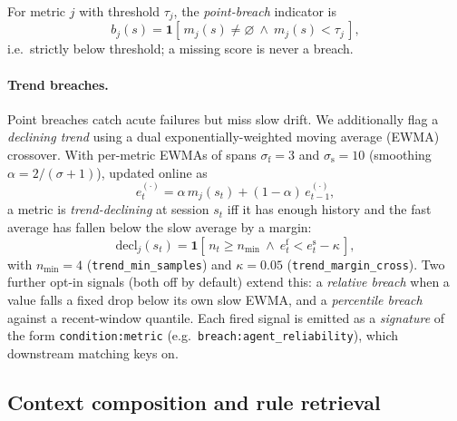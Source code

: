 \documentclass[letterpaper]{article} %
\newcommand{\ind}{\mathbf{1}}                     %
\begin{document}
For metric $j$ with threshold $\tau_j$, the \emph{point-breach}
indicator is
\begin{equation}
  b_j(s) = \ind\!\left[\,m_j(s) \ne \varnothing \ \wedge\ m_j(s) < \tau_j\,\right],
  \label{eq:breach}
\end{equation}
i.e.\ strictly below threshold; a missing score is never a breach.

\paragraph{Trend breaches.} Point breaches catch acute failures but miss slow drift. We
additionally flag a \emph{declining trend} using a dual exponentially-weighted moving average
(EWMA) crossover. With per-metric EWMAs of spans $\sigma_{\mathrm{f}}{=}3$ and
$\sigma_{\mathrm{s}}{=}10$ (smoothing $\alpha=2/(\sigma+1)$), updated online as
\begin{equation}
  e^{(\cdot)}_t = \alpha\,m_j(s_t) + (1-\alpha)\,e^{(\cdot)}_{t-1},
  \label{eq:ewma}
\end{equation}
a metric is \emph{trend-declining} at session $s_t$ iff it has enough history and the fast
average has fallen below the slow average by a margin:
\begin{equation}
  \mathrm{decl}_j(s_t) = \ind\!\left[\, n_t \ge n_{\min} \ \wedge\ e^{\mathrm{f}}_t < e^{\mathrm{s}}_t - \kappa \,\right],
  \label{eq:trend}
\end{equation}
with $n_{\min}{=}4$ (\texttt{trend\_min\_samples}) and $\kappa{=}0.05$
(\texttt{trend\_margin\_cross}). Two further opt-in signals (both off by default) extend this:
a \emph{relative breach} when a value falls a fixed drop below its own slow EWMA, and a
\emph{percentile breach} against a recent-window quantile. Each fired signal is emitted as a
\emph{signature} of the form \texttt{condition:metric} (e.g.\
\texttt{breach:agent\_reliability}), which downstream matching keys on.

\subsection{Context composition and rule retrieval}
\label{sec:retrieval}
\end{document}
